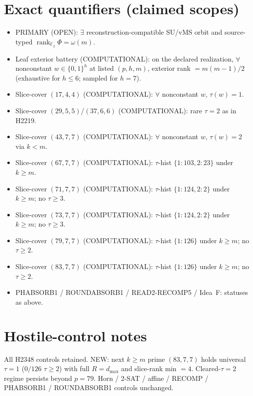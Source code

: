 \documentclass[11pt]{article}
\begin{document}
\section*{Exact quantifiers (claimed scopes)}
\begin{itemize}
\item PRIMARY (OPEN): $\exists$ reconstruction-compatible SU/vMS orbit and source-typed
  $\operatorname{rank}_{\mathbb F_2}\Phi=\omega(m)$.
\item Leaf exterior battery (COMPUTATIONAL): on the declared realization, $\forall$ nonconstant
  $w\in\{0,1\}^h$ at listed $(p,h,m)$, exterior rank $=m(m-1)/2$
  (exhaustive for $h\le6$; sampled for $h{=}7$).
\item Slice-cover $(17,4,4)$ (COMPUTATIONAL): $\forall$ nonconstant $w$, $\tau(w)=1$.
\item Slice-cover $(29,5,5)$/$(37,6,6)$ (COMPUTATIONAL): rare $\tau{=}2$ as in H2219.
\item Slice-cover $(43,7,7)$ (COMPUTATIONAL): $\forall$ nonconstant $w$, $\tau(w)=2$ via $k{<}m$.
\item Slice-cover $(67,7,7)$ (COMPUTATIONAL): $\tau$-hist $\{1{:}103,2{:}23\}$ under $k{\ge}m$.
\item Slice-cover $(71,7,7)$ (COMPUTATIONAL): $\tau$-hist $\{1{:}124,2{:}2\}$ under $k{\ge}m$;
  no $\tau{\ge}3$.
\item Slice-cover $(73,7,7)$ (COMPUTATIONAL): $\tau$-hist $\{1{:}124,2{:}2\}$ under $k{\ge}m$;
  no $\tau{\ge}3$.
\item Slice-cover $(79,7,7)$ (COMPUTATIONAL): $\tau$-hist $\{1{:}126\}$ under $k{\ge}m$;
  no $\tau{\ge}2$.
\item Slice-cover $(83,7,7)$ (COMPUTATIONAL): $\tau$-hist $\{1{:}126\}$ under $k{\ge}m$;
  no $\tau{\ge}2$.
\item PHABSORB1 / ROUNDABSORB1 / READ2-RECOMP5 / Idea~F: statuses as above.
\end{itemize}

\section*{Hostile-control notes}
All H2348 controls retained. NEW: next $k{\ge}m$ prime $(83,7,7)$ holds universal
$\tau{=}1$ ($0/126$ $\tau{\ge}2$) with full $R{=}d_{\max}$ and slice-rank min $=4$.
Cleared-$\tau{=}2$ regime persists beyond $p{=}79$. Horn / 2-SAT / affine /
RECOMP / PHABSORB1 / ROUNDABSORB1 controls unchanged.
\end{document}
